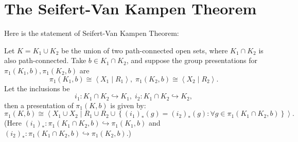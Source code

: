 \chapter{The Seifert-Van Kampen Theorem}
Here is the statement of Seifert-Van Kampen Theorem:
\begin{theorem} Let \(K = {K}_{1} \cup  {K}_{2}\) be the union of two path-connected open sets, where \({K}_{1} \cap  {K}_{2}\) is also path-connected. Take \(b \in  {K}_{1} \cap  {K}_{2}\), and suppose the group presentations for \({\pi }_{1}\left( {{K}_{1},b}\right),{\pi }_{1}\left( {{K}_{2},b}\right)\) are
\[
{\pi }_{1}\left( {{K}_{1},b}\right)  \cong  \left\langle  {{X}_{1} \mid  {R}_{1}}\right\rangle ,\;{\pi }_{1}\left( {{K}_{2},b}\right)  \cong  \left\langle  {{X}_{2} \mid  {R}_{2}}\right\rangle .
\]
Let the inclusions be
\[
{i}_{1} : {K}_{1} \cap  {K}_{2} \hookrightarrow  {K}_{1},\;{i}_{2} : {K}_{1} \cap  {K}_{2} \hookrightarrow  {K}_{2},
\]
then a presentation of \({\pi }_{1}\left( {K,b}\right)\) is given by:
\[
{\pi }_{1}\left( {K,b}\right)  \cong  \left\langle  {{X}_{1} \cup  {X}_{2} \mid  {R}_{1} \cup  {R}_{2} \cup  \left\{  {{\left( {i}_{1}\right) }_{ * }\left( g\right)  = {\left( {i}_{2}\right) }_{ * }\left( g\right)  : \forall g \in  {\pi }_{1}\left( {{K}_{1} \cap  {K}_{2},b}\right) }\right\}  }\right\rangle .
\]
(Here \({\left( {i}_{1}\right) }_{ * } : {\pi }_{1}\left( {{K}_{1} \cap  {K}_{2},b}\right)  \hookrightarrow  {\pi }_{1}\left( {{K}_{1},b}\right)\) and \({\left( {i}_{2}\right) }_{ * } : {\pi }_{1}\left( {{K}_{1} \cap  {K}_{2},b}\right)  \hookrightarrow  {\pi }_{1}\left( {{K}_{2},b}\right)\).)
\end{theorem}

